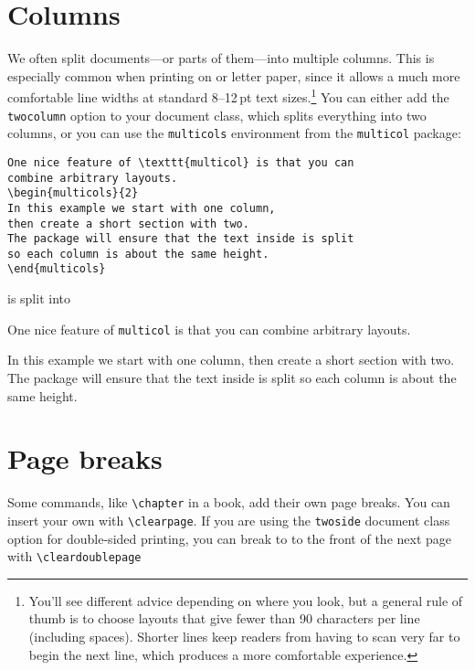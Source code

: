 \section{Columns}

We often split documents---or parts of them---into multiple columns.
This is especially common when printing on  or  letter
paper, since it allows a much more comfortable line widths at standard
8--12\,pt text sizes.\punckern\footnote{You'll see different advice depending
on where you look, but a general rule of thumb is to choose layouts that give
fewer than 90 characters per line (including spaces).
Shorter lines keep readers from having to scan very far to begin the next line,
which produces a more comfortable experience.}
You can either add the \texttt{twocolumn} option to your document class,
which splits everything into two columns, or you can use the \texttt{multicols}
environment from the \texttt{multicol} package:
\begin{leftfigure}
\begin{lstlisting}
One nice feature of \texttt{multicol} is that you can
combine arbitrary layouts.
\begin{multicols}{2}
In this example we start with one column,
then create a short section with two.
The package will ensure that the text inside is split
so each column is about the same height.
\end{multicols}
\end{lstlisting}
\end{leftfigure}
is split into
\begin{leftfigure}
\lm%
One nice feature of \texttt{multicol} is that you can
combine arbitrary layouts.
\begin{multicols}{2}
In this example we start with one column,
then create a short section with two.
The package will ensure that the text inside is split
so each column is about the same height.
\end{multicols}
\end{leftfigure}

\section{Page breaks}

Some commands, like \verb|\chapter| in a book, add their own page breaks.
You can insert your own with \verb|\clearpage|.
If you are using the \texttt{twoside} document class option for double-sided
printing, you can break to to the front of the next page with
\verb|\cleardoublepage|

